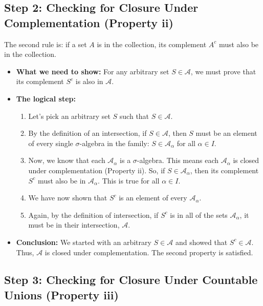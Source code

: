 \documentclass[11pt,a4paper]{article}
\theoremstyle{tutorstyle}
\begin{document}
\subsection*{Step 2: Checking for Closure Under Complementation (Property ii)}

The second rule is: if a set $A$ is in the collection, its complement $A^c$ must also be in the collection.

\begin{itemize}
    \item \textbf{What we need to show:} For any arbitrary set $S \in \mathcal{A}$, we must prove that its complement $S^c$ is also in $\mathcal{A}$.

    \item \textbf{The logical step:}
        \begin{enumerate}
            \item Let's pick an arbitrary set $S$ such that $S \in \mathcal{A}$.
            \item By the definition of an intersection, if $S \in \mathcal{A}$, then $S$ must be an element of every single $\sigma$-algebra in the family: $S \in \mathcal{A}_\alpha$ for all $\alpha \in I$.
            \item Now, we know that each $\mathcal{A}_\alpha$ is a $\sigma$-algebra. This means each $\mathcal{A}_\alpha$ is closed under complementation (Property ii). So, if $S \in \mathcal{A}_\alpha$, then its complement $S^c$ must also be in $\mathcal{A}_\alpha$. This is true for all $\alpha \in I$.
            \item We have now shown that $S^c$ is an element of every $\mathcal{A}_\alpha$.
            \item Again, by the definition of intersection, if $S^c$ is in all of the sets $\mathcal{A}_\alpha$, it must be in their intersection, $\mathcal{A}$.
        \end{enumerate}

    \item \textbf{Conclusion:} We started with an arbitrary $S \in \mathcal{A}$ and showed that $S^c \in \mathcal{A}$. Thus, $\mathcal{A}$ is closed under complementation. The second property is satisfied.
\end{itemize}

\subsection*{Step 3: Checking for Closure Under Countable Unions (Property iii)}
\end{document}

